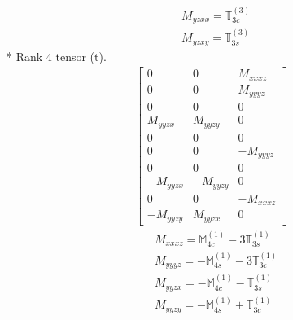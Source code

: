 \documentclass[fleqn,8pt,landscape]{jsarticle}
\begin{document}
\begin{align*}
& M_{yzxx} = \mathbb{T}_{3c}^{(3)} \\
& M_{yzxy} = \mathbb{T}_{3s}^{(3)}
\end{align*}
* Rank 4 tensor (t).
\begin{align*}
\begin{bmatrix} 0 & 0 & M_{xxxz} \\ 0 & 0 & M_{yyyz} \\ 0 & 0 & 0 \\ M_{yyzx} & M_{yyzy} & 0 \\ 0 & 0 & 0 \\ 0 & 0 & - M_{yyyz} \\ 0 & 0 & 0 \\ - M_{yyzx} & - M_{yyzy} & 0 \\ 0 & 0 & - M_{xxxz} \\ - M_{yyzy} & M_{yyzx} & 0 \end{bmatrix}
\end{align*}
\begin{align*}
& M_{xxxz} = \mathbb{M}_{4c}^{(1)} - 3 \mathbb{T}_{3s}^{(1)} \\
& M_{yyyz} = - \mathbb{M}_{4s}^{(1)} - 3 \mathbb{T}_{3c}^{(1)} \\
& M_{yyzx} = - \mathbb{M}_{4c}^{(1)} - \mathbb{T}_{3s}^{(1)} \\
& M_{yyzy} = - \mathbb{M}_{4s}^{(1)} + \mathbb{T}_{3c}^{(1)}
\end{align*}
\end{document}
